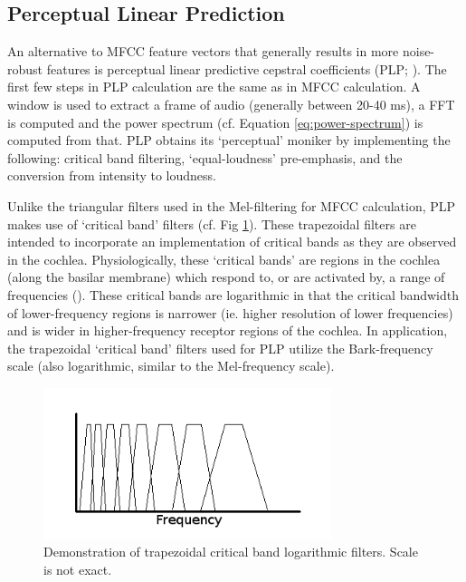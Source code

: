 \subsection{Perceptual Linear Prediction}\label{sec:plp}

An alternative to MFCC feature vectors that generally results in more noise-robust features is perceptual linear predictive cepstral coefficients (PLP; \cite{hermansky:85}).  The first few steps in PLP calculation are the same as in MFCC calculation.  A window is used to extract a frame of audio (generally between 20-40 ms), a FFT is computed and the power spectrum (cf. Equation \ref{eq:power-spectrum}) is computed from that.  PLP obtains its `perceptual' moniker by implementing the following: critical band filtering, `equal-loudness' pre-emphasis, and the conversion from intensity to loudness.  

Unlike the triangular filters used in the Mel-filtering for MFCC calculation, PLP makes use of `critical band' filters (cf. Fig \ref{fig:filt-cb}).  These trapezoidal filters are intended to incorporate an implementation of critical bands as they are observed in the cochlea. Physiologically, these `critical bands' are regions in the cochlea (along the basilar membrane) which respond to, or are activated by, a range of frequencies (\cite{fletcher:40}).  These critical bands are logarithmic in that the critical bandwidth of lower-frequency regions is narrower (ie. higher resolution of lower frequencies) and is wider in higher-frequency receptor regions of the cochlea.  In application, the trapezoidal `critical band' filters used for PLP utilize the Bark-frequency scale (also logarithmic, similar to the Mel-frequency scale).

\begin{figure}[h]
\centering
\includegraphics[width=0.75\textwidth]{figure/filt-cb.png}
\caption{Demonstration of trapezoidal critical band logarithmic filters. Scale is not exact.}\label{fig:filt-cb}
\end{figure}


